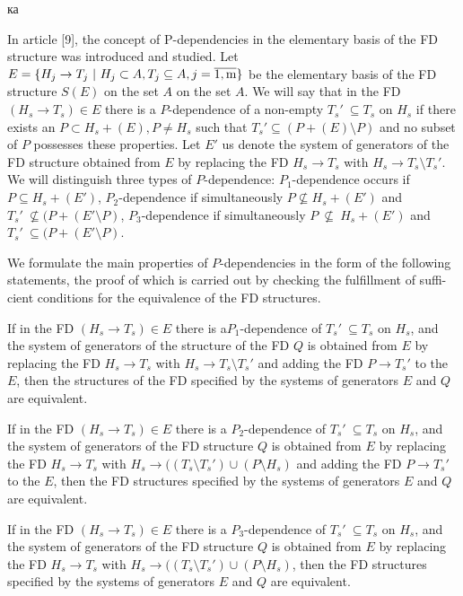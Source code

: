 ка\documentclass[times]{article}
\begin{document}
In article [9], the concept of P-dependencies in the
elementary basis of the FD structure was introduced and
studied. Let $E=\{H_{j} \to T_{j} \ | \ H_{j} \subset A,T_{j} \subseteq A,j=\overline{\rm 1, m}\}$ be the elementary basis of the FD structure $S(E)$
on the set $A$ on the set $A$. We will say that in the FD $(H_{s} \to T_{s}) \in E$ there is a $P$-dependence of a non-empty $T_{s}' \ \subseteq T_{s}$ on $H_{s}$ if there exists an $P \subset H_{s} +(E),P \ne H_{s}$ such that $T_{s}' \subseteq (P +(E)\setminus P)$ and no
subset of $P$ possesses these properties. Let $E′$ us denote the
system of generators of the FD structure obtained from
$E$ by replacing the FD $H_{s} \to T_{s}$ with $H_{s} \to T_{s}\setminus T_{s}'$.
We will distinguish three types of $P$-dependence: $P_{1}$-dependence occurs if $P \subseteq H_{s}+(E′)$, $P_{2}$-dependence if simultaneously $P \not \subseteq H_{s} + (E')$ and $T_{s}' \ \not \subseteq (P+(E' \setminus P)$, $P_{3}$-dependence if simultaneously $P \ \not \subseteq \ H_{s}+(E')$ and $T_{s}' \ \subseteq (P+(E' \setminus P)$.

We formulate the main properties of $P$-dependencies in the form of the following statements, the proof of which is carried out by checking the fulfillment of suffi- cient conditions for the equivalence of the FD structures.

If in the FD $(H_{s} \to T_{s}) \in E$ there is a$P_{1}$-dependence of ${T_{s}' \ \subseteq T_{s}}$ on $H_{s}$, and the system of generators of the structure of the FD $Q$ is obtained from $E$ by replacing the FD $H_{s} \to T_{s}$ with $H_{s} \to T_{s} \setminus T_{s}'$ and adding the FD $P \to T_{s}'$ to the $E$, then the structures of the FD specified by the systems of generators $E$ and $Q$ are equivalent.

If in the FD $(H_{s} \to T_{s}) \in E$ there is a $P_{2}$-dependence of $T_{s}' \ \subseteq T_{s}$ on $H_{s}$, and the system of generators of the FD structure $Q$ is obtained from $E$ by replacing the FD $H_{s} \to T_{s}$ with $H_{s} \to ((T_{s} \setminus T_{s}') \cup (P \setminus H_{s})$ and adding the FD $P \to T_{s}'$ to the $E$, then the FD structures specified by the systems of generators $E$ and $Q$ are equivalent.

If in the FD $(H_{s} \to T_{s}) \in E$ there is a $P_{3}$-dependence of $T_{s}' \ \subseteq T_{s}$ on $H_{s}$, and the system of generators of the FD structure $Q$ is obtained from $E$ by replacing the FD $H_{s} \to T_{s}$ with $H_{s} \to ((T_{s} \setminus T_{s}') \cup (P \setminus H_{s})$, then the FD structures specified by the systems of generators $E$ and $Q$ are equivalent.
\end{document}
